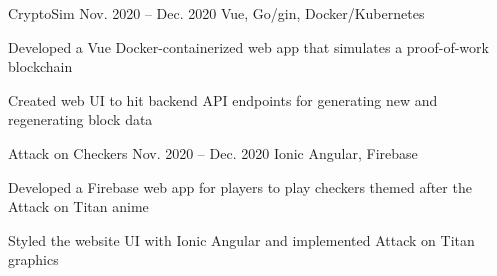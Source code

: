 
\begin{cvprojects}

  \cvproject
  {CryptoSim}
  {\href{https://github.com/jzlotek/bc}{\faGithubSquare\acvHeaderIconSep\@KevinIsMyName}}
  {Nov. 2020 -- Dec. 2020}
  {Vue, Go/gin, Docker/Kubernetes}
  {
    \begin{cvitems}
      \item Developed a Vue Docker-containerized web app that simulates a proof-of-work blockchain
      \item Created web UI to hit backend API endpoints for generating new and regenerating block data
    \end{cvitems}
  }

  \cvproject
  {Attack on Checkers}
  {\href{https://github.com/lixinwei123/SE181}{\faGithubSquare\acvHeaderIconSep\@KevinIsMyName}}
  {Nov. 2020 -- Dec. 2020}
  {Ionic Angular, Firebase}
  {
    \begin{cvitems}
      \item Developed a Firebase web app for players to play checkers themed after the Attack on Titan anime
      \item Styled the website UI with Ionic Angular and implemented Attack on Titan graphics
    \end{cvitems}
  }





\end{cvprojects}
